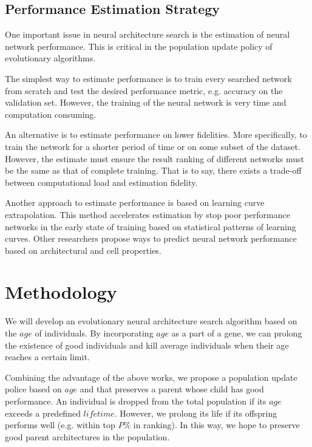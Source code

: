 \documentclass[conference]{IEEEtran}
\begin{document}
    \subsection{Performance Estimation Strategy}
    One important issue in neural architecture search is the estimation of neural network performance. This is critical in the population update policy of evolutionary algorithms. 

    The simplest way to estimate performance is to train every searched network from scratch and test the desired performance metric, e.g. accuracy on the validation set. However, the training of the neural network is very time and computation consuming. 
    
    An alternative is to estimate performance on lower fidelities. More specifically, to train the network for a shorter period of time\cite{zoph2018learning} or on some subset of the dataset\cite{klein2016fast}. However, the estimate must ensure the result ranking of different networks must be the same as that of complete training. That is to say, there exists a trade-off between computational load and estimation fidelity.

    Another approach to estimate performance is based on learning curve extrapolation\cite{domhan2015speeding}. This method accelerates estimation by stop poor performance networks in the early state of training based on statistical patterns of learning curves. Other researchers propose ways to predict neural network performance based on architectural and cell properties\cite{liu2018progressive}. 

    \section{Methodology}

    We will develop an evolutionary neural architecture search algorithm based on the $age$ of individuals. By incorporating $age$ as a part of a gene, we can prolong the existence of good individuals\cite{DBLP:journals/corr/abs-1802-01548} and kill average individuals when their age reaches a certain limit\cite{Hornby:2006:AAP:1143997.1144142}. 

    Combining the advantage of the above works, we propose a population update police based on $age$ and that preserves a parent whose child has good performance. An individual is dropped from the total population if its $age$ exceeds a predefined $lifetime$. However, we prolong its life if its offspring performs well (e.g. within top $P\%$ in ranking). In this way, we hope to preserve good parent architectures in the population.
\end{document}
